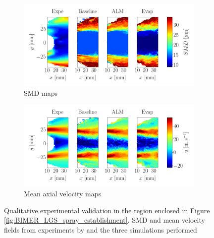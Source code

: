 \begin{figure}[h!]
\centering
\begin{subfigure}[b]{1.0\textwidth}
	\centering 
	\includegraphics[scale=0.7]{./part3_applications/figures_ch9_lagrangian/simus_expe_validation/subplots_maps_SMD.png}
\vspace*{-0.1in}
   \caption{SMD maps}
\end{subfigure}

\vspace*{0.1in}

\begin{subfigure}[b]{1.0\textwidth}
	\centering
	\includegraphics[scale=0.7]{./part3_applications/figures_ch9_lagrangian/simus_expe_validation/subplots_maps_axial_velocity.png}
   \caption{Mean axial velocity maps}
\end{subfigure}
\vspace*{-0.1in}
\caption[Qualitative experimental validation]{Qualitative experimental validation in the region enclosed in Figure \ref{fig:BIMER_LGS_spray_establishment}. SMD and mean velocity fields from experiments by  and the three simulations performed}
\label{fig:validation_BIMER_lgs}
\end{figure}

